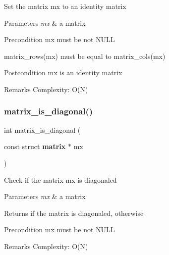 Set the matrix {\ttfamily mx} to an identity matrix


\begin{DoxyParams}{Parameters}
{\em mx} & a matrix\\
\hline
\end{DoxyParams}
\begin{DoxyPrecond}{Precondition}
{\ttfamily mx} must be not N\+U\+LL 

{\ttfamily matrix\+\_\+rows(mx)} must be equal to {\ttfamily matrix\+\_\+cols(mx)}
\end{DoxyPrecond}
\begin{DoxyPostcond}{Postcondition}
{\ttfamily mx} is an identity matrix
\end{DoxyPostcond}
\begin{DoxyRemark}{Remarks}
Complexity\+: O(\+N) 
\end{DoxyRemark}
\mbox{\label{matrix_8c_a2379a87492cbb3bf0c4fdc8e58589d1c}} 
\subsubsection{matrix\+\_\+is\+\_\+diagonal()}
{\footnotesize\ttfamily int matrix\+\_\+is\+\_\+diagonal (\begin{DoxyParamCaption}\item[{const struct \textbf{ matrix} $\ast$}]{mx }\end{DoxyParamCaption})\hspace{0.3cm}{\ttfamily [inline]}}

Check if the matrix {\ttfamily mx} is diagonaled


\begin{DoxyParams}{Parameters}
{\em mx} & a matrix \\
\hline
\end{DoxyParams}
\begin{DoxyReturn}{Returns}
{} if the matrix is diagonaled, {} otherwise
\end{DoxyReturn}
\begin{DoxyPrecond}{Precondition}
{\ttfamily mx} must be not N\+U\+LL
\end{DoxyPrecond}
\begin{DoxyRemark}{Remarks}
Complexity\+: O(\+N) 
\end{DoxyRemark}
\mbox{\label{matrix_8c_a0bc537e836547fd549f64464c938b1d2}} 
